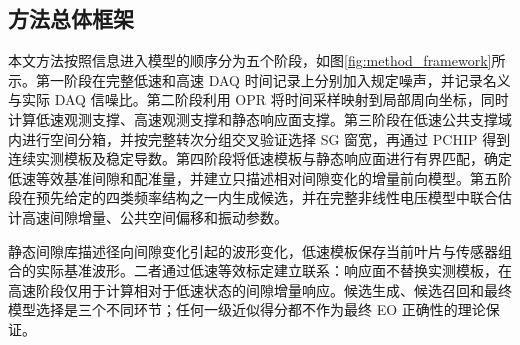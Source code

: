 \documentclass[UTF8,12pt,a4paper]{ctexart}
\begin{document}
\subsection{方法总体框架}

本文方法按照信息进入模型的顺序分为五个阶段，如图\ref{fig:method_framework}所示。第一阶段在完整低速和高速 DAQ 时间记录上分别加入规定噪声，并记录名义与实际 DAQ 信噪比。第二阶段利用 OPR 将时间采样映射到局部周向坐标，同时计算低速观测支撑、高速观测支撑和静态响应面支撑。第三阶段在低速公共支撑域内进行空间分箱，并按完整转次分组交叉验证选择 SG 窗宽，再通过 PCHIP 得到连续实测模板及稳定导数。第四阶段将低速模板与静态响应面进行有界匹配，确定低速等效基准间隙和配准量，并建立只描述相对间隙变化的增量前向模型。第五阶段在预先给定的四类频率结构之一内生成候选，并在完整非线性电压模型中联合估计高速间隙增量、公共空间偏移和振动参数。

静态间隙库描述径向间隙变化引起的波形变化，低速模板保存当前叶片与传感器组合的实际基准波形。二者通过低速等效标定建立联系：响应面不替换实测模板，在高速阶段仅用于计算相对于低速状态的间隙增量响应。候选生成、候选召回和最终模型选择是三个不同环节；任何一级近似得分都不作为最终 EO 正确性的理论保证。
\end{document}
